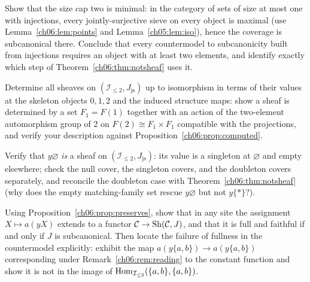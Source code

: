 \begin{exercise}\label{ch06:exr:minimality}
Show that the size cap two is minimal: in the category of sets of size at
most one with injections, every jointly-surjective sieve on every object
is maximal (use Lemma~\ref{ch06:lem:points} and
Lemma~\ref{ch05:lem:iso}), hence the coverage is subcanonical there.
Conclude that every countermodel to subcanonicity built from injections
requires an object with at least two elements, and identify exactly which
step of Theorem~\ref{ch06:thm:notsheaf} uses it.
\end{exercise}

\begin{exercise}\label{ch06:exr:othersheaves}
Determine all sheaves on $(\mathcal{I}_{\le 2},J_{\mathrm{js}})$ up to
isomorphism in terms of their values at the skeleton objects $0,1,2$ and
the induced structure maps: show a sheaf is determined by a set
$F_1=F(1)$ together with an action of the two-element automorphism group
of $2$ on $F(2)\cong F_1\times F_1$ compatible with the projections, and
verify your description against Proposition~\ref{ch06:prop:computed}.
\end{exercise}

\begin{exercise}\label{ch06:exr:emptyrep}
Verify that $y\varnothing$ \emph{is} a sheaf on
$(\mathcal{I}_{\le 2},J_{\mathrm{js}})$: its value is a singleton at
$\varnothing$ and empty elsewhere; check the null cover, the singleton
covers, and the doubleton covers separately, and reconcile the doubleton
case with Theorem~\ref{ch06:thm:notsheaf} (why does the empty
matching-family set rescue $y\varnothing$ but not $y\{*\}$?).
\end{exercise}

\begin{exercise}\label{ch06:exr:functor}
Using Proposition~\ref{ch06:prop:preserves}, show that in any site the
assignment $X\mapsto a(yX)$ extends to a functor $\mathcal{C}\to\mathrm{Sh}(\mathcal{C},J)$, and
that it is full and faithful if and only if $J$ is subcanonical. Then
locate the failure of fullness in the countermodel explicitly: exhibit the
map $a(y\{a,b\})\to a(y\{a,b\})$ corresponding under
Remark~\ref{ch06:rem:reading} to the constant function and show it is not
in the image of $\mathrm{Hom}_{\mathcal{I}_{\le 2}}(\{a,b\},\{a,b\})$.
\end{exercise}

